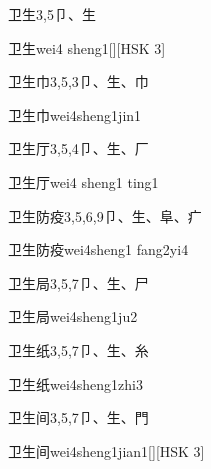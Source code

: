 \begin{Entry}{卫生}{3,5}{⼙、⽣}
  \begin{Phonetics}{卫生}{wei4 sheng1}[][HSK 3]
  \end{Phonetics}
\end{Entry}

\begin{Entry}{卫生巾}{3,5,3}{⼙、⽣、⼱}
  \begin{Phonetics}{卫生巾}{wei4sheng1jin1}
  \end{Phonetics}
\end{Entry}

\begin{Entry}{卫生厅}{3,5,4}{⼙、⽣、⼚}
  \begin{Phonetics}{卫生厅}{wei4 sheng1 ting1}
  \end{Phonetics}
\end{Entry}

\begin{Entry}{卫生防疫}{3,5,6,9}{⼙、⽣、⾩、⽧}
  \begin{Phonetics}{卫生防疫}{wei4sheng1 fang2yi4}
  \end{Phonetics}
\end{Entry}

\begin{Entry}{卫生局}{3,5,7}{⼙、⽣、⼫}
  \begin{Phonetics}{卫生局}{wei4sheng1ju2}
  \end{Phonetics}
\end{Entry}

\begin{Entry}{卫生纸}{3,5,7}{⼙、⽣、⽷}
  \begin{Phonetics}{卫生纸}{wei4sheng1zhi3}
  \end{Phonetics}
\end{Entry}

\begin{Entry}{卫生间}{3,5,7}{⼙、⽣、⾨}
  \begin{Phonetics}{卫生间}{wei4sheng1jian1}[][HSK 3]
  \end{Phonetics}
\end{Entry}

